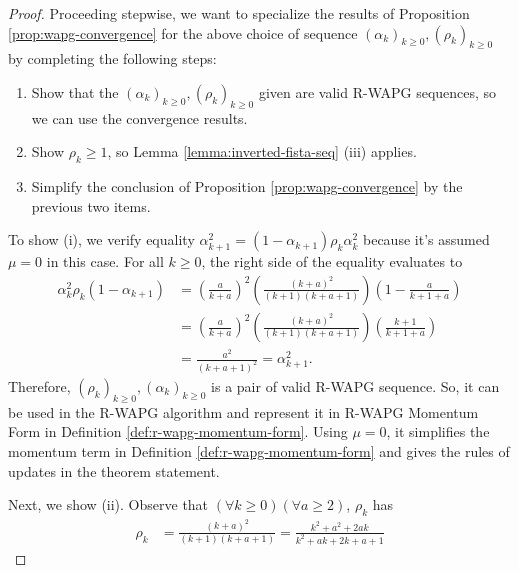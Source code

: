 \documentclass[12pt]{article}
\begin{document}
    \begin{proof}
        Proceeding stepwise, we want to specialize the results of Proposition \ref{prop:wapg-convergence} for the above choice of sequence $(\alpha_k)_{k \ge 0}, (\rho_k)_{k \ge 0}$  by completing the following steps:
        \begin{enumerate}
            \item Show that the $(\alpha_k)_{k \ge 0}, (\rho_k)_{k \ge 0}$ given are valid R-WAPG sequences, so we can use the convergence results.
            \item Show $\rho_k \ge 1$, so Lemma \ref{lemma:inverted-fista-seq} (iii) applies.
            \item Simplify the conclusion of Proposition \ref{prop:wapg-convergence} by the previous two items.
        \end{enumerate}
        To show (i), we verify equality $\alpha_{k + 1}^2 = (1 - \alpha_{k + 1})\rho_k \alpha_k^2$ because it's assumed $\mu = 0$ in this case.
        For all $k \ge 0$, the right side of the equality evaluates to
        \begin{align*}
            \alpha_k^2 \rho_k(1 - \alpha_{k + 1}) &=
            \left(
                \frac{a}{k + a}
            \right)^2 \left(
                \frac{(k + a)^2}{(k + 1)(k + a + 1)}
            \right)
            \left(
                1 - \frac{a}{k + 1 + a}
            \right)
            \\
            &= \left(
                \frac{a}{k + a}
            \right)^2 \left(
                \frac{(k + a)^2}{(k + 1)(k + a + 1)}
            \right)
            \left(
                \frac{k + 1}{k + 1 + a}
            \right)
            \\
            &= \frac{a^2}{(k + a + 1)^2} = \alpha_{k + 1}^2.
        \end{align*}
        Therefore, $(\rho_k)_{k \ge 0}, (\alpha_k)_{k \ge 0}$ is a pair of valid R-WAPG sequence.
        So, it can be used in the R-WAPG algorithm and represent it in R-WAPG Momentum Form in Definition \ref{def:r-wapg-momentum-form}.
        Using $\mu = 0$, it simplifies the momentum term in Definition \ref{def:r-wapg-momentum-form} and gives the rules of updates in the theorem statement.
        \par
        Next, we show (ii).
        Observe that $(\forall k \ge 0)(\forall a \ge 2)$, $\rho_k$ has
        \begin{align*}
            \rho_k &= \frac{(k + a)^2}{(k + 1)(k + a + 1)} = \frac{k^2 + a^2 + 2ak}{k^2 + ak + 2k + a + 1}

\end{align*}
\end{proof}
\end{document}
